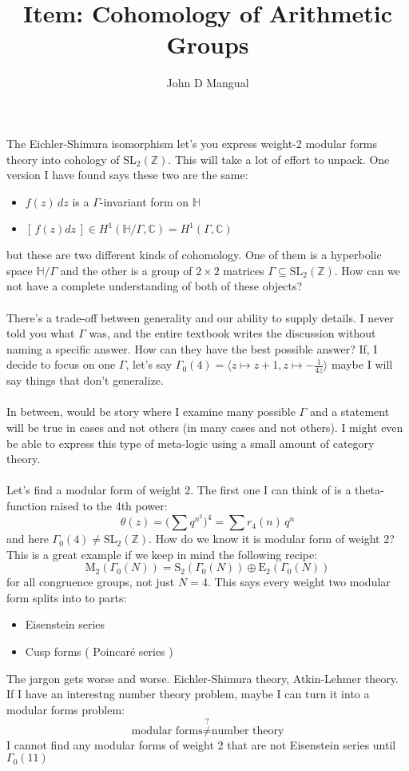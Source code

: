 \documentclass[12pt]{article}
\title{Item: \textbf{Cohomology of Arithmetic Groups}}
\author{John D Mangual}
\date{}
\begin{document}
\selectfont \fontsize{12.5}{15}\selectfont

\maketitle

\noindent The Eichler-Shimura isomorphism let's you express weight-2 modular forms theory into cohology of $\text{SL}_2(\mathbb{Z})$. This will take a lot of effort to unpack.  One version I have found says these two are the same:
\begin{itemize}
\item $f(z) \, dz$ is a $\Gamma$-invariant form on $\mathbb{H}$
\item $[ \, f(z) dz \, ] \in H^1 (\mathbb{H}/\Gamma, \mathbb{C}) = H^1(\Gamma, \mathbb{C})$
\end{itemize}
but these are two different kinds of cohomology.  One of them is a hyperbolic space $\mathbb{H}/\Gamma$ and the other is a group of $2 \times 2$ matrices $\Gamma \subseteq \text{SL}_2(\mathbb{Z})$.  How can we not have a complete understanding of both of these objects? \\ \\
There's a trade-off between generality and our ability to supply details.  I never told you what $\Gamma$ was, and the entire textbook writes the discussion without naming a specific answer.  How can they have the best possible answer?  If, I decide to focus on one $\Gamma$, let's say $\Gamma_0(4) = \langle z \mapsto z + 1, z \mapsto - \frac{1}{4z}\rangle$ maybe I will say things that don't generalize.  \\ \\
In between, would be story where I examine many possible $\Gamma$ and a statement will be true in cases and not others (in many cases and not others). I might even be able to express this type of meta-logic using a small amount of category theory. \\ \\
Let's find a modular form of weight 2.  The first one I can think of is a theta-function raised to the 4th power:
$$  \theta(z) = \big( \sum q^{n^2} \big)^4 = \sum r_4(n) \, q^n $$
and here $\Gamma_0(4) \neq \text{SL}_2(\mathbb{Z})$. How do we know it is modular form of weight 2?  This is a great example if we keep in mind the following recipe:
$$ \text{M}_2(\Gamma_0(N)) = \text{S}_2(\Gamma_0(N)) \oplus \text{E}_2(\Gamma_0(N)) $$
for all congruence groups, not just $N = 4$.  This says every weight two modular form splits into to parts:
\begin{itemize}
\item Eisenstein series
\item Cusp forms ( Poincar\'{e} series )
\end{itemize}
The jargon gets worse and worse.  Eichler-Shimura theory, Atkin-Lehmer theory.   If I have an interestng number theory problem, maybe I can turn it into a modular forms problem:
$$ \text{modular forms} \stackrel{?}{\not =} \text{number theory} $$
I cannot find any modular forms of weight 2 that are not Eisenstein series until $\Gamma_0(11)$
\end{document}
